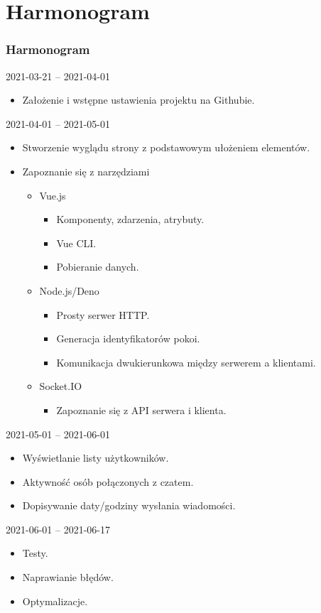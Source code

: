\documentclass[aspectratio=169]{beamer}
\begin{document}
\section{Harmonogram}
\begin{frame}[allowframebreaks]
  \frametitle{Harmonogram}
  2021-03-21 -- 2021-04-01
  \begin{itemize}
    \item Założenie i wstępne ustawienia projektu na Githubie.
  \end{itemize}
  2021-04-01 -- 2021-05-01
  \begin{itemize}
    \item Stworzenie wyglądu strony z podstawowym ułożeniem elementów.
    \item Zapoznanie się z narzędziami
    \begin{itemize}
      \item Vue.js
      \begin{itemize}
        \item Komponenty, zdarzenia, atrybuty.
        \item Vue CLI.
        \item Pobieranie danych.
      \end{itemize}
      \item Node.js/Deno
      \begin{itemize}
        \item Prosty serwer HTTP.
        \item Generacja identyfikatorów pokoi.
        \item Komunikacja dwukierunkowa między serwerem a klientami.
      \end{itemize}
      \item Socket.IO
      \begin{itemize}
        \item Zapoznanie się z API serwera i klienta.
      \end{itemize}
    \end{itemize}
  \end{itemize}
  2021-05-01 -- 2021-06-01
  \begin{itemize}
    \item Wyświetlanie listy użytkowników.
    \item Aktywność osób połączonych z czatem.
    \item Dopisywanie daty/godziny wysłania wiadomości.
  \end{itemize}
  2021-06-01 -- 2021-06-17
  \begin{itemize}
    \item Testy.
    \item Naprawianie błędów.
    \item Optymalizacje.
  \end{itemize}
\end{frame}
\end{document}
